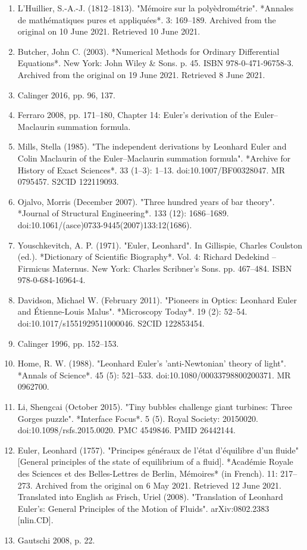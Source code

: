\begin{enumerate}
\item L'Huillier, S.-A.-J. (1812–1813). "Mémoire sur la polyèdrométrie". *Annales de mathématiques pures et appliquées*. 3: 169–189. Archived from the original on 10 June 2021. Retrieved 10 June 2021.
\item Butcher, John C. (2003). *Numerical Methods for Ordinary Differential Equations*. New York: John Wiley & Sons. p. 45. ISBN 978-0-471-96758-3. Archived from the original on 19 June 2021. Retrieved 8 June 2021.
\item Calinger 2016, pp. 96, 137.
\item Ferraro 2008, pp. 171–180, Chapter 14: Euler's derivation of the Euler–Maclaurin summation formula.
\item Mills, Stella (1985). "The independent derivations by Leonhard Euler and Colin Maclaurin of the Euler–Maclaurin summation formula". *Archive for History of Exact Sciences*. 33 (1–3): 1–13. doi:10.1007/BF00328047. MR 0795457. S2CID 122119093.

\item Ojalvo, Morris (December 2007). "Three hundred years of bar theory". *Journal of Structural Engineering*. 133 (12): 1686–1689. doi:10.1061/(asce)0733-9445(2007)133:12(1686).
\item Youschkevitch, A. P. (1971). "Euler, Leonhard". In Gillispie, Charles Coulston (ed.). *Dictionary of Scientific Biography*. Vol. 4: Richard Dedekind – Firmicus Maternus. New York: Charles Scribner's Sons. pp. 467–484. ISBN 978-0-684-16964-4.
\item Davidson, Michael W. (February 2011). "Pioneers in Optics: Leonhard Euler and Étienne-Louis Malus". *Microscopy Today*. 19 (2): 52–54. doi:10.1017/s1551929511000046. S2CID 122853454.
\item Calinger 1996, pp. 152–153.
\item Home, R. W. (1988). "Leonhard Euler's 'anti-Newtonian' theory of light". *Annals of Science*. 45 (5): 521–533. doi:10.1080/00033798800200371. MR 0962700.
\item Li, Shengcai (October 2015). "Tiny bubbles challenge giant turbines: Three Gorges puzzle". *Interface Focus*. 5 (5). Royal Society: 20150020. doi:10.1098/rsfs.2015.0020. PMC 4549846. PMID 26442144.
\item Euler, Leonhard (1757). "Principes généraux de l'état d'équilibre d'un fluide" [General principles of the state of equilibrium of a fluid]. *Académie Royale des Sciences et des Belles-Lettres de Berlin, Mémoires* (in French). 11: 217–273. Archived from the original on 6 May 2021. Retrieved 12 June 2021. Translated into English as Frisch, Uriel (2008). "Translation of Leonhard Euler's: General Principles of the Motion of Fluids". arXiv:0802.2383 [nlin.CD].
\item Gautschi 2008, p. 22.

\end{enumerate}
